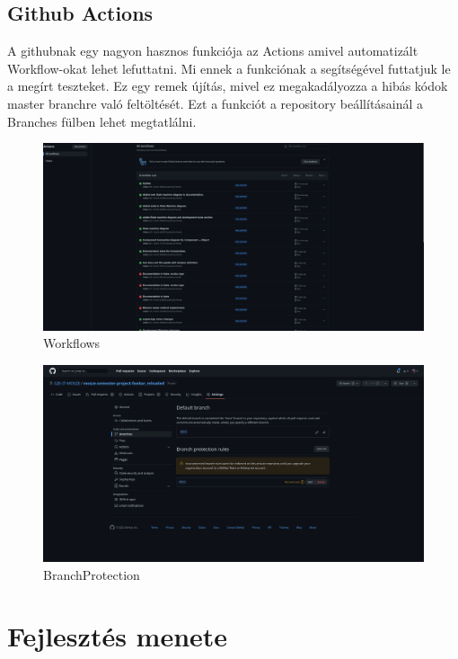 \documentclass{scrarticle}
\begin{document}
\subsection{Github Actions}
A githubnak egy nagyon hasznos funkciója az Actions amivel automatizált Workflow-okat lehet lefuttatni. Mi ennek a funkciónak a segítségével futtatjuk le a megírt teszteket. Ez egy remek újítás, mivel ez megakadályozza a hibás kódok master branchre való feltöltését. Ezt a funkciót a repository beállításainál a Branches fülben lehet megtatlálni.
\begin{figure}[H]
    \includegraphics[width=1.0\columnwidth]{github_actions.png}
    \caption{Workflows}\label{fig:7}
\end{figure}
\begin{figure}[H]
    \includegraphics[width=1.0\columnwidth]{github_branch_protection.png}
    \caption{BranchProtection}\label{fig:8}
\end{figure}
\newpage

\section{Fejlesztés menete}
\end{document}
